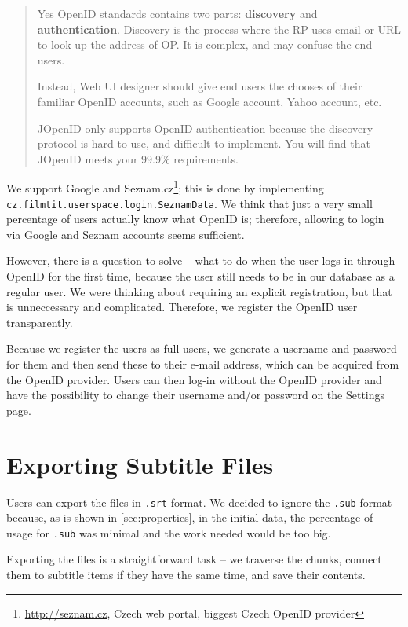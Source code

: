 \begin{quote}Yes OpenID standards contains two parts: \textbf{discovery} and \textbf{authentication}. Discovery is the process where the RP uses email or URL to look up the address of OP. It is complex, and may confuse the end users.

Instead, Web UI designer should give end users the chooses of their familiar OpenID accounts, such as Google account, Yahoo account, etc.

JOpenID only supports OpenID authentication because the discovery protocol is hard to use, and difficult to implement. You will find that JOpenID meets your 99.9\% requirements.
\end{quote}

We support Google and Seznam.cz\footnote{\url{http://seznam.cz}, Czech web portal, biggest Czech OpenID provider}; this is done by implementing {\tt{cz.filmtit.userspace.login.SeznamData}}. We think that just a very small percentage of users actually know what OpenID is; therefore, allowing to login via Google and Seznam accounts seems sufficient.

However, there is a question to solve -- what to do when the user logs in through OpenID for the first time, because the user still needs to be in our database as a regular user. We were thinking about requiring an explicit registration, but that is unneccessary and complicated. Therefore, we register the OpenID user transparently.

Because we register the users as full users, we generate a username and password for them and then send these to their e-mail address, which  can be acquired from the OpenID provider. Users can then log-in without the OpenID provider and  have the possibility to change their username and/or password on the Settings page.


\section{Exporting Subtitle Files}
\label{sec:export}

Users can export the files in {\tt .srt} format. We decided to ignore the {\tt .sub} format because, as is shown in \ref{sec:properties}, in the initial data, the percentage of usage for {\tt .sub} was minimal and the work needed would be too big.

Exporting the files is a straightforward task -- we traverse the chunks, connect them to subtitle items if they have the same time, and save their contents.

